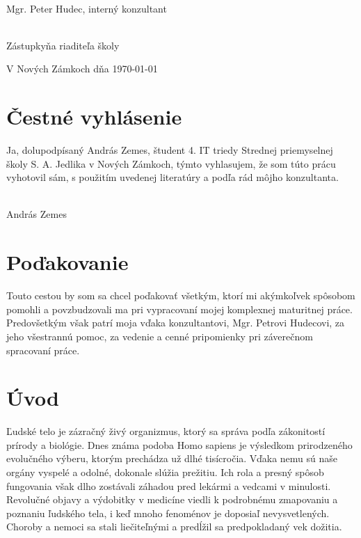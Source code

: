 \documentclass[titlepage]{article}
\begin{document}
\vspace{10mm}
\hrulefill
\\\hspace*{0mm}\phantom{v.r.: }Mgr. Peter Hudec, interný konzultant

\vspace{10mm}
\hrulefill
\\\hspace*{0mm}\phantom{v.r.: }Zástupkyňa riaditeľa školy

\vspace{10mm}
V Nových Zámkoch dňa \today


\section*{Čestné vyhlásenie}

Ja, dolupodpísaný András Zemes, študent 4. IT triedy Strednej priemyselnej školy S. A. Jedlika v Nových Zámkoch, týmto vyhlasujem, že som túto prácu   vyhotovil sám, s použitím uvedenej literatúry a podľa rád môjho konzultanta. 

\vspace{10mm}
\hrulefill
\\\hspace*{0mm}\phantom{v.r.: }András Zemes
\newpage

\section*{Poďakovanie}
Touto cestou by som sa chcel poďakovať všetkým, ktorí mi akýmkoľvek spôsobom pomohli a povzbudzovali ma pri vypracovaní mojej komplexnej maturitnej práce. Predovšetkým však patrí moja vďaka konzultantovi, Mgr. Petrovi Hudecovi, za jeho všestrannú pomoc, za vedenie a cenné pripomienky pri záverečnom spracovaní práce.

\newpage
\tableofcontents

\newpage
\section{Úvod}
Ľudské telo je zázračný živý organizmus, ktorý sa správa podľa zákonitostí prírody a biológie. Dnes známa podoba Homo sapiens je výsledkom prirodzeného evolučného výberu, ktorým prechádza už dlhé tisícročia. Vďaka nemu sú naše orgány vyspelé a odolné, dokonale slúžia prežitiu. Ich rola a presný spôsob fungovania však dlho zostávali záhadou pred lekármi a vedcami v minulosti. Revolučné objavy a výdobitky v medicíne viedli k podrobnému zmapovaniu a poznaniu ľudského tela, i keď mnoho fenoménov je doposiaľ nevysvetlených. Choroby a nemoci sa stali liečiteľnými a predĺžil sa predpokladaný vek dožitia.
\end{document}
